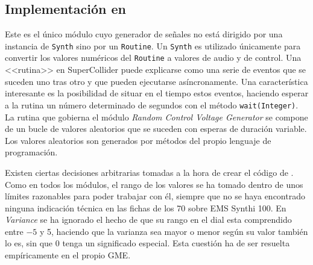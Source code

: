 \subsection{Implementación en \appName}
Este es el único módulo cuyo generador de señales no está dirigido por una instancia de \texttt{Synth} sino por un \texttt{Routine}. Un \texttt{Synth} es utilizado únicamente para convertir los valores numéricos del \texttt{Routine} a valores de audio y de control. Una <<rutina>> en SuperCollider puede explicarse como una serie de eventos que se suceden uno tras otro y que pueden ejecutarse asíncronamente. Una característica interesante es la posibilidad de situar en el tiempo estos eventos, haciendo esperar a la rutina un número determinado de segundos con el método \texttt{wait(Integer)}. La rutina que gobierna el módulo \textit{Random Control Voltage Generator} se compone de un bucle de valores aleatorios que se suceden con esperas de duración variable. Los valores aleatorios son generados por métodos del propio lenguaje de programación.

Existen ciertas decisiones arbitrarias tomadas a la hora de crear el código de \appName. Como en todos los módulos, el rango de los valores se ha tomado dentro de unos límites razonables para poder trabajar con él, siempre que no se haya encontrado ninguna indicación técnica en las fichas de los 70 sobre EMS Synthi 100. En \textit{Variance} se ha ignorado el hecho de que su rango en el dial esta comprendido entre $-5$ y 5, haciendo que la varianza sea mayor o menor según su valor también lo es, sin que 0 tenga un significado especial. Esta cuestión ha de ser resuelta empíricamente en el propio GME.